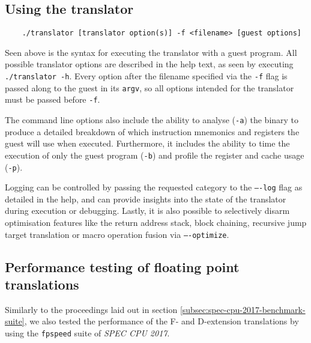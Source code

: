 \subsection{Using the translator}
\label{sec:translator-usage}
\begin{lstlisting}
	./translator [translator option(s)] -f <filename> [guest options]
\end{lstlisting}

Seen above is the syntax for executing the translator with a guest program.
All possible translator options are described in the help text, as seen by executing \texttt{./translator -h}.
Every option after the filename specified via the \texttt{-f} flag is passed along to the guest in its \texttt{argv}, so all options intended for the translator must be passed before \texttt{-f}.

The command line options also include the ability to analyse (\texttt{-a}) the binary to produce a detailed breakdown of which instruction mnemonics and registers the guest will use when executed.
Furthermore, it includes the ability to time the execution of only the guest program (\texttt{-b}) and profile the register and cache usage (\texttt{-p}).

Logging can be controlled by passing the requested category to the \texttt{----log} flag as detailed in the help, and can provide insights into the state of the translator during execution or debugging.
Lastly, it is also possible to selectively disarm optimisation features like the return address stack, block chaining, recursive jump target translation or macro operation fusion via \texttt{----optimize}.

\subsection{Performance testing of floating point translations}
Similarly to the proceedings laid out in section \ref{subsec:spec-cpu-2017-benchmark-suite}, we also tested the performance of the F- and D-extension translations by using the \texttt{fpspeed} suite of \textit{SPEC CPU 2017}.

